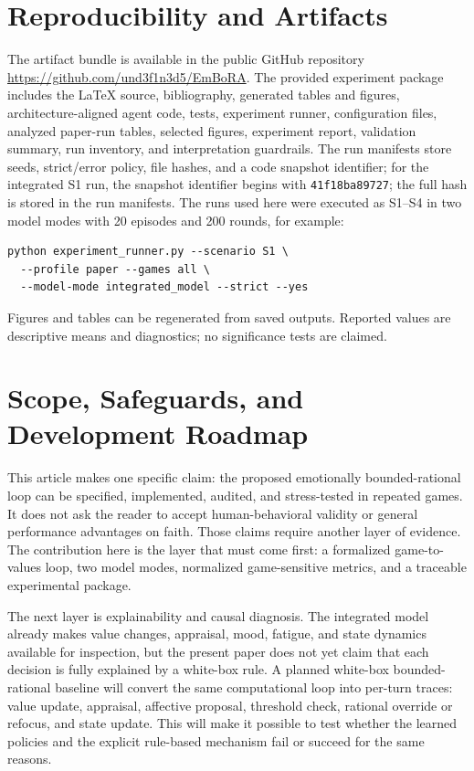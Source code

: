 \documentclass[runningheads]{llncs}
\begin{document}
\section{Reproducibility and Artifacts}
The artifact bundle is available in the public GitHub repository \url{https://github.com/und3f1n3d5/EmBoRA}. The provided experiment package includes the LaTeX source, bibliography, generated tables and figures, architecture-aligned agent code, tests, experiment runner, configuration files, analyzed paper-run tables, selected figures, experiment report, validation summary, run inventory, and interpretation guardrails. The run manifests store seeds, strict/error policy, file hashes, and a code snapshot identifier; for the integrated S1 run, the snapshot identifier begins with \texttt{41f18ba89727}; the full hash is stored in the run manifests. The runs used here were executed as S1--S4 in two model modes with 20 episodes and 200 rounds, for example:
\begin{verbatim}
python experiment_runner.py --scenario S1 \
  --profile paper --games all \
  --model-mode integrated_model --strict --yes
\end{verbatim}
Figures and tables can be regenerated from saved outputs. Reported values are descriptive means and diagnostics; no significance tests are claimed.

\section{Scope, Safeguards, and Development Roadmap}
This article makes one specific claim: the proposed emotionally bounded-rational loop can be specified, implemented, audited, and stress-tested in repeated games. It does not ask the reader to accept human-behavioral validity or general performance advantages on faith. Those claims require another layer of evidence. The contribution here is the layer that must come first: a formalized game-to-values loop, two model modes, normalized game-sensitive metrics, and a traceable experimental package.

The next layer is explainability and causal diagnosis. The integrated model already makes value changes, appraisal, mood, fatigue, and state dynamics available for inspection, but the present paper does not yet claim that each decision is fully explained by a white-box rule. A planned white-box bounded-rational baseline will convert the same computational loop into per-turn traces: value update, appraisal, affective proposal, threshold check, rational override or refocus, and state update. This will make it possible to test whether the learned policies and the explicit rule-based mechanism fail or succeed for the same reasons.
\end{document}
